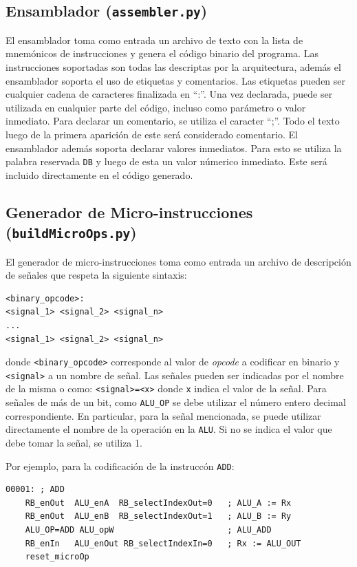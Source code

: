 \documentclass[a4paper,11pt]{article}
\begin{document}
\subsection*{Ensamblador (\texttt{assembler.py})}

El ensamblador toma como entrada un archivo de texto con la lista de mnemónicos de instrucciones y genera el código binario del programa.
Las instrucciones soportadas son todas las descriptas por la arquitectura, además el ensamblador soporta el uso de etiquetas y comentarios.
Las etiquetas pueden ser cualquier cadena de caracteres finalizada en ``:''. Una vez declarada, puede ser utilizada en cualquier parte del código, incluso como parámetro o valor inmediato.
Para declarar un comentario, se utiliza el caracter ``;''.
Todo el texto luego de la primera aparición de este será considerado comentario.
El ensamblador además soporta declarar valores inmediatos.
Para esto se utiliza la palabra reservada \texttt{DB} y luego de esta un valor númerico inmediato.
Este será incluido directamente en el código generado.

\subsection*{Generador de Micro-instrucciones (\texttt{buildMicroOps.py})}

El generador de micro-instrucciones toma como entrada un archivo de descripción de señales que respeta la siguiente sintaxis:

\small
\begin{verbatim}
<binary_opcode>:
<signal_1> <signal_2> <signal_n>
...
<signal_1> <signal_2> <signal_n>
\end{verbatim}
\normalsize

\noindent donde \verb|<binary_opcode>| corresponde al valor de \emph{opcode} a codificar en binario y \verb|<signal>| a un nombre de señal.
Las señales pueden ser indicadas por el nombre de la misma o como: \verb|<signal>=<x>| donde \verb|x| indica el valor de la señal.
Para señales de más de un bit, como \verb|ALU_OP| se debe utilizar el número entero decimal correspondiente.
En particular, para la señal mencionada, se puede utilizar directamente el nombre de la operación en la \texttt{ALU}.
Si no se indica el valor que debe tomar la señal, se utiliza 1.

\noindent Por ejemplo, para la codificación de la instruccón \verb|ADD|:

\small
\begin{verbatim}
00001: ; ADD
    RB_enOut  ALU_enA  RB_selectIndexOut=0   ; ALU_A := Rx
    RB_enOut  ALU_enB  RB_selectIndexOut=1   ; ALU_B := Ry
    ALU_OP=ADD ALU_opW                       ; ALU_ADD
    RB_enIn   ALU_enOut RB_selectIndexIn=0   ; Rx := ALU_OUT
    reset_microOp
\end{verbatim}
\normalsize
\end{document}
